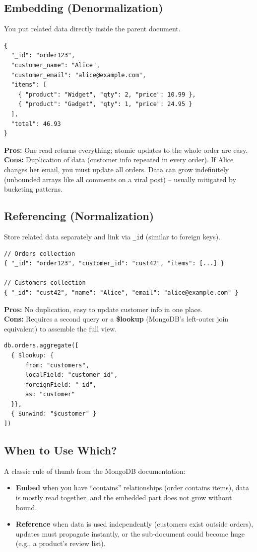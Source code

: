\documentclass[12pt,a4paper]{article}
\begin{document}
\subsection{Embedding (Denormalization)}
You put related data directly inside the parent document.
\begin{lstlisting}[caption=Order with embedded line items, label=lst:embed]
{
  "_id": "order123",
  "customer_name": "Alice",
  "customer_email": "alice@example.com",
  "items": [
    { "product": "Widget", "qty": 2, "price": 10.99 },
    { "product": "Gadget", "qty": 1, "price": 24.95 }
  ],
  "total": 46.93
}
\end{lstlisting}
\textbf{Pros:} One read returns everything; atomic updates to the whole order are easy.\\
\textbf{Cons:} Duplication of data (customer info repeated in every order). If Alice changes her email, you must update all orders. Data can grow indefinitely (unbounded arrays like all comments on a viral post) -- usually mitigated by bucketing patterns.

\subsection{Referencing (Normalization)}
Store related data separately and link via \texttt{\_id} (similar to foreign keys).
\begin{lstlisting}[caption=References, label=lst:ref]
// Orders collection
{ "_id": "order123", "customer_id": "cust42", "items": [...] }

// Customers collection
{ "_id": "cust42", "name": "Alice", "email": "alice@example.com" }
\end{lstlisting}
\textbf{Pros:} No duplication, easy to update customer info in one place.\\
\textbf{Cons:} Requires a second query or a \textbf{\$lookup} (MongoDB's left-outer join equivalent) to assemble the full view.

\begin{lstlisting}[caption=\$lookup (join) example, label=lst:lookup]
db.orders.aggregate([
  { $lookup: {
      from: "customers",
      localField: "customer_id",
      foreignField: "_id",
      as: "customer"
  }},
  { $unwind: "$customer" }
])
\end{lstlisting}

\subsection{When to Use Which?}
A classic rule of thumb from the MongoDB documentation:
\begin{itemize}
    \item \textbf{Embed} when you have ``contains'' relationships (order contains items), data is mostly read together, and the embedded part does not grow without bound.
    \item \textbf{Reference} when data is used independently (customers exist outside orders), updates must propagate instantly, or the sub-document could become huge (e.g., a product's review list).
\end{itemize}
\end{document}
